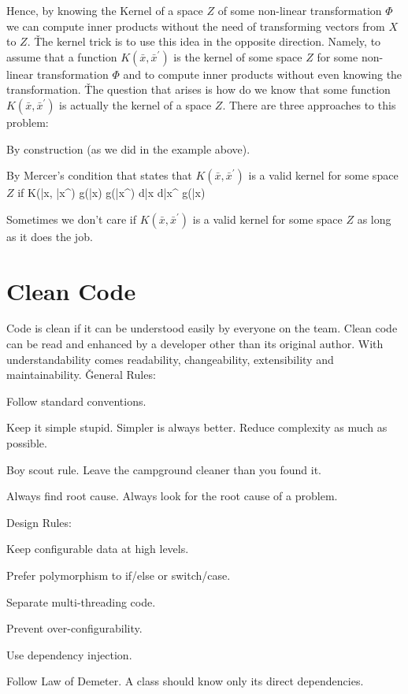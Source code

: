 Hence, by knowing the Kernel of a space $Z$ of some non-linear transformation $\Phi$ we can compute inner products
without the need of transforming vectors from $X$ to $Z$. \v

The kernel trick is to use this idea in the opposite direction. Namely, to assume that a function $K(\bar{x},
\bar{x}^\prime)$ is the kernel of some space $Z$ for some non-linear transformation $\Phi$ and to compute inner
products without even knowing the transformation. \v

The question that arises is how do we know that some function $K(\bar{x}, \bar{x}^\prime)$ is actually the kernel of
a space $Z$. There are three approaches to this problem:
\ben
\item By construction (as we did in the example above).
\item By Mercer's condition that states that $K(\bar{x}, \bar{x}^\prime)$ is a valid kernel for some space $Z$ if
\bse
\int K(\bar{x}, \bar{x}^\prime) g(\bar{x}) g(\bar{x}^\prime) d\bar{x} d\bar{x}^\prime {} \:\:\: \forall \:\:\:
 \:\:\: g(\bar{x})
\ese

\item Sometimes we don't care if $K(\bar{x}, \bar{x}^\prime)$ is a valid kernel for some space $Z$ as long as it does
the job.
\een

\chapter{Clean Code}

Code is clean if it can be understood easily by everyone on the team. Clean code can be read and enhanced by a developer
other than its original author. With understandability comes readability, changeability, extensibility and
maintainability. \v

General Rules:
\bit
\item Follow standard conventions.
\item Keep it simple stupid. Simpler is always better. Reduce complexity as much as possible.
\item Boy scout rule. Leave the campground cleaner than you found it.
\item Always find root cause. Always look for the root cause of a problem.
\eit

Design Rules:
\bit
\item Keep configurable data at high levels.
\item Prefer polymorphism to if/else or switch/case.
\item Separate multi-threading code.
\item Prevent over-configurability.
\item Use dependency injection.
\item Follow Law of Demeter. A class should know only its direct dependencies.
\eit

